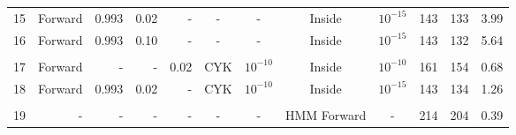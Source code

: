 \begin{tabular}{r|r|rr|r|cc|cc|c|c|r}
15& Forward & $0.993$& 0.02 & -              & - & -           & Inside    & $10^{-15}$                       & 143     & 133    &  3.99 \\ %
16& Forward & $0.993$& 0.10 & -              & - & -           & Inside    & $10^{-15}$                       & 143     & 132    &  5.64 \\ %
& & & & & & & & & & & \\
17& Forward & - & - & 0.02           & CYK & $10^{-10}$   & Inside    & $10^{-10}$                          & 161     & 154    &  0.68 \\ %
18& Forward & $0.993$& 0.02 & -           & CYK & $10^{-10}$  & Inside    & $10^{-15}$                     & 143     & 134    &  1.26 \\ %
& & & & & & & & & & & \\
19& -       & -      &    - & -           &   - &       -     & HMM Forward & -                            & 214     & 204    & 0.39  \\ %

\end{tabular}


